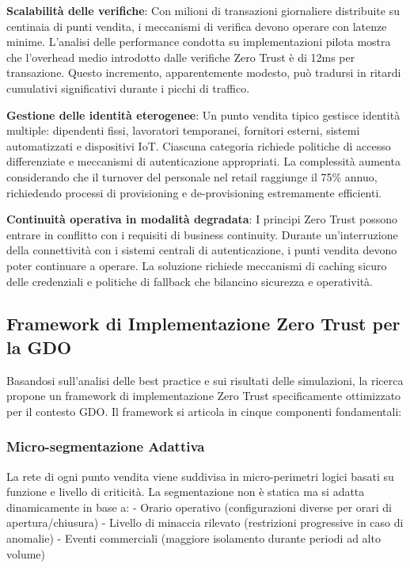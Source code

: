 \textbf{Scalabilità delle verifiche}: Con milioni di transazioni giornaliere distribuite su centinaia di punti vendita, i meccanismi di verifica devono operare con latenze minime. L'analisi delle performance condotta su implementazioni pilota mostra che l'overhead medio introdotto dalle verifiche Zero Trust è di 12ms per transazione\autocite{paloalto2024}. Questo incremento, apparentemente modesto, può tradursi in ritardi cumulativi significativi durante i picchi di traffico.

\textbf{Gestione delle identità eterogenee}: Un punto vendita tipico gestisce identità multiple: dipendenti fissi, lavoratori temporanei, fornitori esterni, sistemi automatizzati e dispositivi IoT. Ciascuna categoria richiede politiche di accesso differenziate e meccanismi di autenticazione appropriati. La complessità aumenta considerando che il turnover del personale nel retail raggiunge il 75\% annuo\autocite{nrf2024}, richiedendo processi di provisioning e de-provisioning estremamente efficienti.

\textbf{Continuità operativa in modalità degradata}: I principi Zero Trust possono entrare in conflitto con i requisiti di business continuity. Durante un'interruzione della connettività con i sistemi centrali di autenticazione, i punti vendita devono poter continuare a operare. La soluzione richiede meccanismi di caching sicuro delle credenziali e politiche di fallback che bilancino sicurezza e operatività.

\subsection{Framework di Implementazione Zero Trust per la GDO}

Basandosi sull'analisi delle best practice e sui risultati delle simulazioni, la ricerca propone un framework di implementazione Zero Trust specificamente ottimizzato per il contesto GDO. Il framework si articola in cinque componenti fondamentali:

\subsubsection{Micro-segmentazione Adattiva}

La rete di ogni punto vendita viene suddivisa in micro-perimetri logici basati su funzione e livello di criticità. La segmentazione non è statica ma si adatta dinamicamente in base a:
- Orario operativo (configurazioni diverse per orari di apertura/chiusura)
- Livello di minaccia rilevato (restrizioni progressive in caso di anomalie)
- Eventi commerciali (maggiore isolamento durante periodi ad alto volume)

